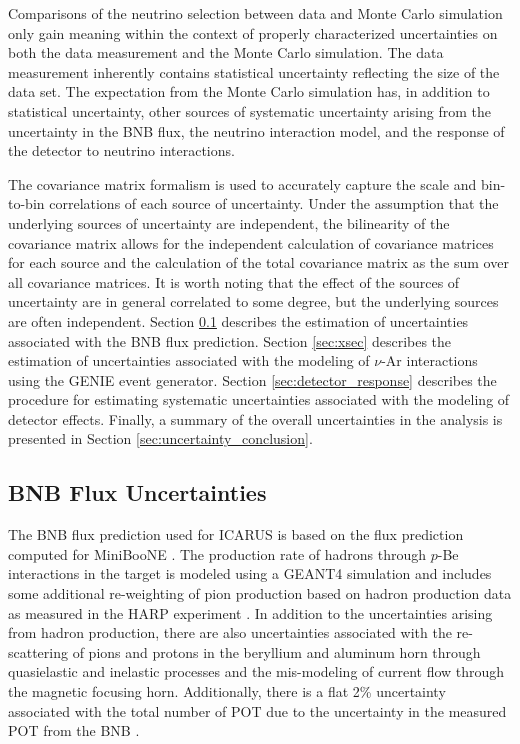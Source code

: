 Comparisons of the neutrino selection between data and Monte Carlo simulation only gain meaning within the context of properly characterized uncertainties on both the data measurement and the Monte Carlo simulation. The data measurement inherently contains statistical uncertainty reflecting the size of the data set. The expectation from the Monte Carlo simulation has, in addition to statistical uncertainty, other sources of systematic uncertainty arising from the uncertainty in the BNB flux, the neutrino interaction model, and the response of the detector to neutrino interactions.

The covariance matrix formalism \cite{Eaton2007} is used to accurately capture the scale and bin-to-bin correlations of each source of uncertainty. Under the assumption that the underlying sources of uncertainty are independent, the bilinearity of the covariance matrix allows for the independent calculation of covariance matrices for each source and the calculation of the total covariance matrix as the sum over all covariance matrices. It is worth noting that the effect of the sources of uncertainty are in general correlated to some degree, but the underlying sources are often independent. Section \ref{sec:bnb_flux} describes the estimation of uncertainties associated with the BNB flux prediction. Section \ref{sec:xsec} describes the estimation of uncertainties associated with the modeling of $\nu$-Ar interactions using the GENIE event generator. Section \ref{sec:detector_response} describes the procedure for estimating systematic uncertainties associated with the modeling of detector effects. Finally, a summary of the overall uncertainties in the analysis is presented in Section \ref{sec:uncertainty_conclusion}.

\subsection{BNB Flux Uncertainties}
\label{sec:bnb_flux}
The BNB flux prediction used for ICARUS is based on the flux prediction computed for MiniBooNE \cite{Aguilar2009}. The production rate of hadrons through $p$-Be interactions in the target is modeled using a GEANT4 simulation \cite{Agostinelli2003} and includes some additional re-weighting of pion production based on hadron production data as measured in the HARP experiment \cite{Prior2005}. In addition to the uncertainties arising from hadron production, there are also uncertainties associated with the re-scattering of pions and protons in the beryllium and aluminum horn through quasielastic and inelastic processes and the mis-modeling of current flow through the magnetic focusing horn. Additionally, there is a flat 2\% uncertainty associated with the total number of POT due to the uncertainty in the measured POT from the BNB \cite{Aguilar2009}.

